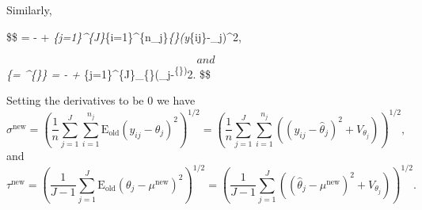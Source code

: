 \documentclass[
]{article}
\begin{document}
Similarly,

\$\$  =
- + 
\sum\emph{\{j=1\}\^{}\{J\}\sum}\{i=1\}\^{}\{n\_j\}\emph{\{\}(y}\{ij\}-\theta\_j)\^{}2,

\[
and
\]
\Big\rvert\emph{\{\mu =
\mu\^{}\{\}\} = - + 
\sum}\{j=1\}\^{}\{J\}\_\{\}(\theta\_j-\mu\textsuperscript{\{\})}2.
\$\$

Setting the derivatives to be \(0\) we have \[
\sigma^{\text{new}} = \left(\frac{1}{n}\sum_{j=1}^{J}\sum_{i=1}^{n_j}\text{E}_{\text{old}}(y_{ij}-\theta_j)^2 \right)^{1/2} = \left(\frac{1}{n}\sum_{j=1}^{J}\sum_{i=1}^{n_j}\left((y_{ij}-\hat{\theta}_j)^2 + V_{\theta_j}\right) \right)^{1/2},
\] and \[
\tau^{\text{new}} =\left(\frac{1}{J-1}\sum_{j=1}^{J}\text{E}_{\text{old}}(\theta_j-\mu^{\text{new}})^2 \right)^{1/2} = \left(\frac{1}{J-1}\sum_{j=1}^{J}\left((\hat{\theta}_j - \mu^{\text{new}})^2 + V_{\theta_j}\right) \right)^{1/2}.
\]
\end{document}
